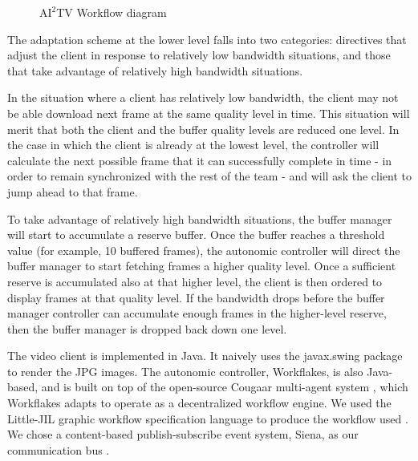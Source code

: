 \documentclass{sig-alternate}
\begin{document}
\begin{figure} 
  \centering
  \hspace*{-5mm}
  \caption{$\mathrm{AI}^2$TV Workflow diagram }
  \label{ljil}
\end{figure}

The adaptation scheme at the lower level falls into two categories:
directives that adjust the client in response to relatively low
bandwidth situations, and those that take advantage of relatively high
bandwidth situations.

In the situation where a client has relatively low bandwidth, the
client may not be able download next frame at the same quality level
in time.  This situation will merit that both the client and the
buffer quality levels are reduced one level. In the case in which the
client is already at the lowest level, the controller will calculate
the next possible frame that it can successfully complete in time - in
order to remain synchronized with the rest of the team - and will ask
the client to jump ahead to that frame.

To take advantage of relatively high bandwidth situations, the buffer
manager will start to accumulate a reserve buffer.  Once the buffer
reaches a threshold value (for example, 10 buffered frames), the
autonomic controller will direct the buffer manager to start fetching
frames a higher quality level.  Once a sufficient reserve is
accumulated also at that higher level, the client is then ordered to
display frames at that quality level.  If the bandwidth drops before
the buffer manager controller can accumulate enough frames in the
higher-level reserve, then the buffer manager is dropped back down one
level.


The video client is implemented in Java. It naively uses the
javax.swing package to render the JPG images.  The autonomic
controller, Workflakes, is also Java-based, and is built on top of the
open-source Cougaar multi-agent system \cite{COUGAAR}, which
Workflakes adapts to operate as a decentralized workflow engine.  We
used the Little-JIL graphic workflow specification language to produce
the workflow used \cite{LJIL}.  We chose a content-based
publish-subscribe event system, Siena, as our communication bus
\cite{SIENA}.
\end{document}
